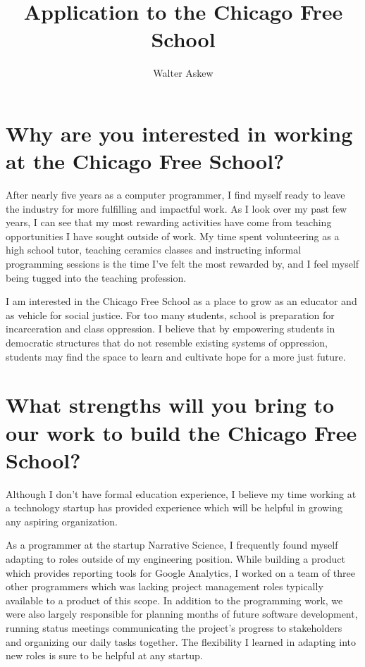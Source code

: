 \documentclass[oneside]{memoir}
\author{Walter Askew}
\title{Application to the Chicago Free School}
\begin{document}
\maketitle

\section*{Why are you interested in working at the Chicago Free
  School?}
After nearly five years as a computer programmer, I find myself ready
to leave the industry for more fulfilling and impactful work.
As I look over my past few years, I can see that my most
rewarding activities have come from teaching opportunities I have
sought outside of work.
My time spent volunteering as a high school tutor, teaching ceramics
classes and instructing informal programming sessions is the time I've
felt the most rewarded by, and I feel myself being tugged into the
teaching profession.

I am interested in the Chicago Free School as a place to grow as an
educator and as vehicle for social justice.
For too many students, school is preparation for incarceration and
class oppression.
I believe that by empowering students in democratic structures that do
not resemble existing systems of oppression, students may find the
space to learn and cultivate hope for a more just future.

\section*{What strengths will you bring to our work to build the
  Chicago Free School?} 
Although I don't have formal education experience, I believe my time
working at a technology startup has provided experience which will be
helpful in growing any aspiring organization.

As a programmer at the startup Narrative Science, I frequently found
myself adapting to roles outside of my engineering position.
While building a product which provides reporting tools for Google
Analytics, I worked on a team of three other programmers which was
lacking project management roles typically available to a product of
this scope.
In addition to the programming work, we were also largely responsible
for planning months of future software development, running status
meetings communicating the project's progress to stakeholders and
organizing our daily tasks together.
The flexibility I learned in adapting into new roles is sure to be
helpful at any startup.
\end{document}
